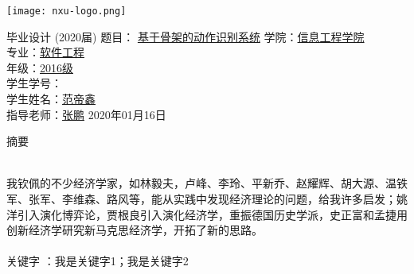 \documentclass[a4paper]{article}
\begin{document}
    \begin{titlepage}
        \renewcommand{\baselinestretch}{2}
        \begin{center}
            \parbox[b]{7cm}{
            \texttt{[image: nxu-logo.png]}
            }
            \vskip 1.5cm
            \hwli \fontsize{42}{44.9} 毕\quad 业\quad 设\quad 计
            \vskip 1cm
            \heiti {} (2020届)
            \vskip 1cm
            \heiti {} 
                题目：
                \underline{\quad 基于骨架的动作识别系统\quad}
            \vskip 2cm
            \songti {}
            学\qquad 院：\underline{\quad 信息工程学院\quad}\\
            专\qquad 业：\underline{\qquad 软件工程\qquad}\\
            年\qquad 级：\underline{\qquad 2016级\quad \qquad}\\
            学生学号：\underline{\qquad}\\
            学生姓名：\underline{\qquad 范帝鑫\qquad \quad}\\
            指导老师：\underline{\qquad \quad 张鹏\quad \qquad}
            \vskip 1.5cm
            2020年01月16日
        \end{center}
        
    \end{titlepage}
    
    \begin{titlepage}
        \centerline{\heiti {} 摘要}
        ~\\
        
        \renewcommand{\baselinestretch}{1.5}
        \songti {}
        \setlength{\parindent}{2em}
        我钦佩的不少经济学家，如林毅夫，卢峰、李玲、平新乔、赵耀辉、胡大源、温铁军、张军、李维森、路风等，能从实践中发现经济理论的问题，给我许多启发；姚洋引入演化博弈论，贾根良引入演化经济学，重振德国历史学派，史正富和孟捷用创新经济学研究新马克思经济学，开拓了新的思路。
        \\\\
        \heiti {}关键字
        \songti {}：我是关键字1；我是关键字2
    \end{titlepage}
   
\end{document}
